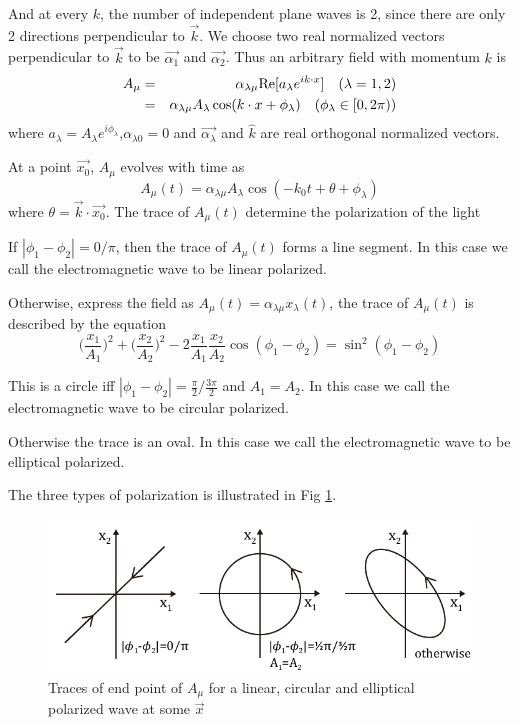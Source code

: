 \documentclass[12pt]{book}
\begin{document}
	And at every $k$, the number of independent plane waves is 2, since there are only 2 directions perpendicular to $\vec k$. We choose two real normalized vectors perpendicular to $\vec k$ to be $\vec{\alpha_1}$ and $\vec{\alpha_2}$. Thus an arbitrary field with momentum $k$ is
	\begin{eqnarray}
		A_\mu&=&\alpha_{\lambda\mu}{\rm Re}[a_\lambda e^{ik\cdot x}]\quad(\lambda=1,2)\\
		&=&\alpha_{\lambda\mu}A_\lambda\cos(k\cdot x+\phi_\lambda)\quad(\phi_\lambda\in[0,2\pi))
	\end{eqnarray}
	where $a_\lambda=A_\lambda e^{i\phi_\lambda}$,$\alpha_{\lambda0}=0$ and $\vec{\alpha_\lambda}$ and $\hat k$ are real orthogonal normalized vectors. 
	
	At a point $\vec {x_0}$, $A_\mu$ evolves with time as
	\begin{equation}
		A_\mu(t)=\alpha_{\lambda\mu}A_\lambda\cos(-k_0t+\theta+\phi_\lambda)
	\end{equation}
	where $\theta=\vec k\cdot\vec {x_0}$. The trace of $A_\mu(t)$ determine the polarization of the light
	
	If $|\phi_1-\phi_2| =0/\pi$, then the trace of $A_\mu(t)$ forms a line segment. In this case we call the electromagnetic wave to be linear polarized.
	
	Otherwise, express the field as $A_\mu(t)=\alpha_{\lambda\mu}x_\lambda(t)$, the trace of $A_\mu(t)$ is described by the equation
	\begin{equation}
		\Big(\frac{x_1}{A_1}\Big)^2+\Big(\frac{x_2}{A_2}\Big)^2-2\frac{x_1}{A_1}\frac{x_2}{A_2}\cos(\phi_1-\phi_2)=\sin^2(\phi_1-\phi_2)
	\end{equation}
	
	This is a circle iff $|\phi_1-\phi_2| =\frac\pi 2/\frac{3\pi}2$ and $A_1=A_2$. In this case we call the electromagnetic wave to be circular polarized.
	
	Otherwise the trace is an oval. In this case we call the electromagnetic wave to be elliptical polarized.
	
	The three types of polarization is illustrated in Fig \ref{fig:plolarization}.
	\begin{figure}[htb]
		\centering  
		\includegraphics[width=360pt]{resources/chap_classical/1_9_polarization.pdf}
		\caption{Traces of end point of $A_\mu$ for a linear, circular and elliptical polarized wave at some $\vec x$}
		\label{fig:plolarization} 
	\end{figure}
	
\end{document}
